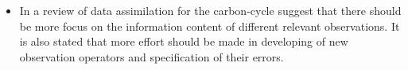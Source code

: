 \documentclass[12pt, a4paper]{article}
\begin{document}
\begin{itemize}
\item In a review of data assimilation for the carbon-cycle \citet{rayner2010current} suggest that there should be more focus on the information content of different relevant observations. It is also stated that more effort should be made in developing of new observation operators and specification of their errors.

\end{itemize}


{}
\end{document}
